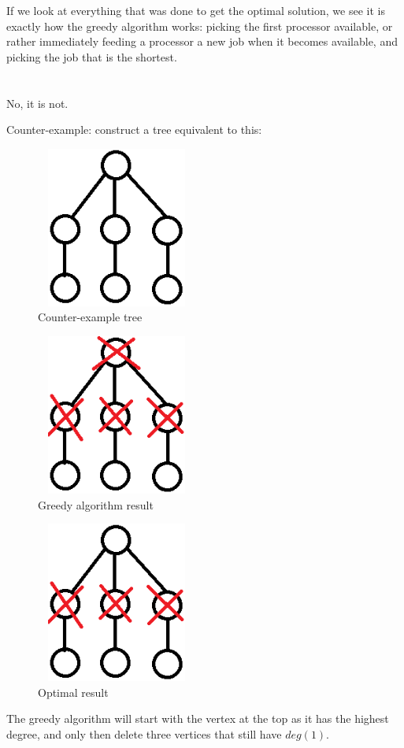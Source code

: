 \documentclass[11pt,letterpaper]{article}
\begin{document}
		If we look at everything that was done to get the optimal solution, we see it is exactly how the greedy algorithm works: picking the first processor available, or rather immediately feeding a processor a new job when it becomes available, and picking the job that is the shortest.
		
	\section{}
		No, it is not.
		
		Counter-example: construct a tree equivalent to this:
		\begin{figure}[h]
			\centering
			\includegraphics[width=200px,height=200px,keepaspectratio]{vertexdeletionce.png}
			\linespread{0.8}\caption{Counter-example tree}
		\end{figure}
		\begin{figure}[h]
			\centering
			\includegraphics[width=200px,height=200px,keepaspectratio]{vertexdeletioncegreedywrong.png}
			\linespread{0.8}\caption{Greedy algorithm result}
		\end{figure}
		\begin{figure}[h]
			\centering
			\includegraphics[width=200px,height=200px,keepaspectratio]{vertexdeletionceoptimalright.png}
			\linespread{0.8}\caption{Optimal result}
		\end{figure}
		\clearpage
		The greedy algorithm will start with the vertex at the top as it has the highest degree, and only then delete three vertices that still have $deg(1)$.
		
\end{document}

